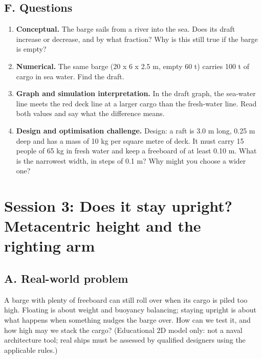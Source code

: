 \documentclass[11pt,a4paper]{article}
\begin{document}
\subsection*{F. Questions}
\begin{enumerate}[nosep]
\item \textbf{Conceptual.} The barge sails from a river into the sea. Does its draft increase or decrease, and by what fraction? Why is this still true if the barge is empty?
\item \textbf{Numerical.} The same barge (20 x 6 x 2.5 m, empty 60 t) carries 100 t of cargo in sea water. Find the draft.
\item \textbf{Graph and simulation interpretation.} In the draft graph, the sea-water line meets the red deck line at a larger cargo than the fresh-water line. Read both values and say what the difference means.
\item \textbf{Design and optimisation challenge.} Design: a raft is 3.0 m long, 0.25 m deep and has a mass of 10 kg per square metre of deck. It must carry 15 people of 65 kg in fresh water and keep a freeboard of at least 0.10 m. What is the narrowest width, in steps of 0.1 m? Why might you choose a wider one?
\end{enumerate}

\section{Session 3: Does it stay upright? Metacentric height and the righting arm}

\subsection*{A. Real-world problem}
A barge with plenty of freeboard can still roll over when its cargo is piled too high. Floating is about weight and buoyancy balancing; staying upright is about what happens when something nudges the barge over. How can we test it, and how high may we stack the cargo? (Educational 2D model only: not a naval architecture tool; real ships must be assessed by qualified designers using the applicable rules.)
\end{document}

